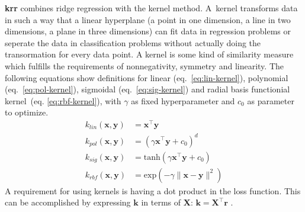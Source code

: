 \textbf{\Gls{krr}} combines ridge regression with the kernel method. 
A~kernel transforms data in such a way that a linear hyperplane (a point in one dimension, a line in two dimensions, 
a plane in three dimensions) can fit data in regression problems or seperate the data in classification problems without actually doing the transormation for every data point. 
A kernel is some kind of similarity measure 
which fulfills the requirements of nonnegativity, symmetry and linearity\cite{rupp2015machine}.
The following equations show definitions for 
linear (eq.~\ref{eq:lin-kernel}), 
polynomial (eq.~\ref{eq:pol-kernel}), 
sigmoidal (eq.~\ref{eq:sig-kernel}) and 
radial basis functionial kernel~(eq. \ref{eq:rbf-kernel}), with $\gamma$ as fixed hyperparameter and $c_0$ as parameter to optimize.
\begin{align}
    \label{eq:lin-kernel}
    k_{lin}(\mathbf{x},\mathbf{y}) &= \mathbf{x}^{\top} \mathbf{y} \\
    \label{eq:pol-kernel}
    k_{pol}(\mathbf{x}, \mathbf{y}) &= (\gamma \mathbf{x}^{\top} \mathbf{y} + c_0)^d \\
    \label{eq:sig-kernel}
    k_{sig}(\mathbf{x}, \mathbf{y}) &= \text{tanh}(\gamma \mathbf{x}^{\top} \mathbf{y} + c_0) \\
    \label{eq:rbf-kernel}
    k_{rbf}(\mathbf{x}, \mathbf{y}) &= \text{exp}(- \gamma \| \mathbf{x} -  \mathbf{y} \|^2) 
\end{align}
A requirement for using kernels is having a dot product in the loss function. 
This can be accomplished by expressing $\mathbf{k}$ in terms of $\mathbf{X}$: $\mathbf{k}=\mathbf{X}^\top \mathbf{r}$
\cite{rudin2020least}.

